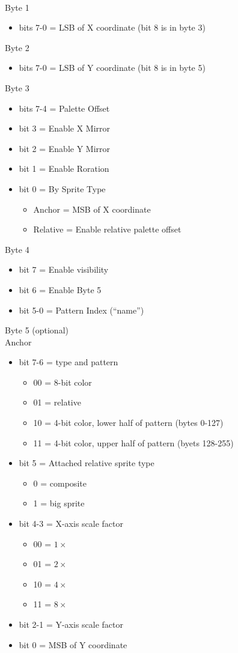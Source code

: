 \\
Byte 1
\begin{itemize}
\item[] bits 7-0 = LSB of X coordinate (bit 8 is in byte 3)
\end{itemize}
Byte 2
\begin{itemize}
\item[] bits 7-0 = LSB of Y coordinate (bit 8 is in byte 5)
\end{itemize}
Byte 3
\begin{itemize}
\item[] bits 7-4 = Palette Offset
\item[] bit 3 = Enable X Mirror
\item[] bit 2 = Enable Y Mirror
\item[] bit 1 = Enable Roration
\item[] bit 0 = By Sprite Type
  \begin{itemize}
  \item[] Anchor = MSB of X coordinate
  \item[] Relative = Enable relative palette offset
  \end{itemize}    
\end{itemize}
Byte 4
\begin{itemize}
\item[] bit 7 = Enable visibility
\item[] bit 6 = Enable Byte 5
\item[] bit 5-0 = Pattern Index (``name'')
\end{itemize}
Byte 5 (optional)\\
Anchor
\begin{itemize}
\item[] bit 7-6 = type and pattern
  \begin{itemize}
  \item[] 00 = 8-bit color
  \item[] 01 = relative
  \item[] 10 = 4-bit color, lower half of pattern (bytes 0-127)
  \item[] 11 = 4-bit color, upper half of pattern (byets 128-255)
  \end{itemize}
\item[] bit 5 = Attached relative sprite type
  \begin{itemize}
  \item[] 0 = composite
  \item[] 1 = big sprite
  \end{itemize}
\item[] bit 4-3 = X-axis scale factor
  \begin{itemize}
  \item[] 00 = $1\times$
  \item[] 01 = $2\times$ 
  \item[] 10 = $4\times$ 
  \item[] 11 = $8\times$ 
  \end{itemize}
\item[] bit 2-1 = Y-axis scale factor
\item[] bit 0 = MSB of Y coordinate
\end{itemize}
